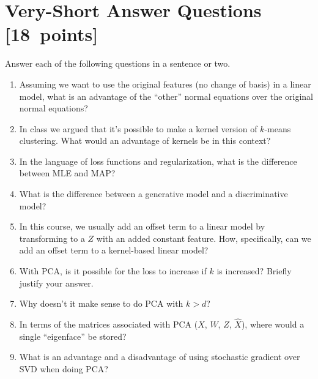 \documentclass{article}
\newcommand{\blu}[1]{{\textcolor{blu}{#1}}}
\let\ask\blu
\newcommand\pts[1]{\textcolor{pointscolour}{[#1~points]}}
\begin{document}
\clearpage
\section{Very-Short Answer Questions \pts{18}}
\ask{Answer each of the following questions in a sentence or two.}
\begin{enumerate}
\item Assuming we want to use the original features (no change of basis) in a linear model, what is an advantage of the ``other'' normal equations over the original normal equations?


\item In class we argued that it's possible to make a kernel version of $k$-means clustering. What would an advantage of kernels be in this context?


\item In the language of loss functions and regularization, what is the difference between MLE and MAP?


\item What is the difference between a generative model and a discriminative model?


\item In this course, we usually add an offset term to a linear model by transforming to a $Z$ with an added constant feature. How, specifically, can we add an offset term to a kernel-based linear model?


\item With PCA, is it possible for the loss to increase if $k$ is increased? Briefly justify your answer.

\item Why doesn't it make sense to do PCA with $k > d$?


\item In terms of the matrices associated with PCA ($X$, $W$, $Z$, $\hat{X}$), where would a single ``eigenface'' be stored?


\item What is an advantage and a disadvantage of using stochastic gradient over SVD when doing PCA?



\end{enumerate}
\end{document}
